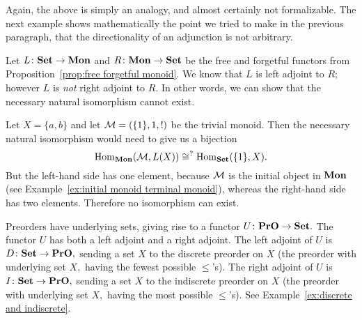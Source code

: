 \documentclass[CT4S-EN-RU]{subfiles}
\begin{document}
\begin{blockRUS}
\end{blockRUS}

\begin{blockENG}
Again, the above is simply an analogy, and almost certainly not formalizable. The next example shows mathematically the point we tried to make in the previous paragraph, that the directionality of an adjunction is not arbitrary.
\end{blockENG}

\begin{blockRUS}
\end{blockRUS}

\begin{exampleENG}\label{ex:adjunction monoids and sets}
Let $L\colon{\mathbf{Set}}\rightarrow{\mathbf{Mon}}$ and $R\colon{\mathbf{Mon}}\rightarrow{\mathbf{Set}}$ be the free and forgetful functors from Proposition~\ref{prop:free forgetful monoid}. We know that $L$ is left adjoint to $R$; however $L$ is {\em not} right adjoint to $R.$ In other words, we can show that the necessary natural isomorphism cannot exist.

Let $X=\{a,b\}$ and let $\mathcal{M}=(\{1\},1,!)$ be the trivial monoid. Then the necessary natural isomorphism would need to give us a bijection 
$$\operatorname{Hom}_{\mathbf{Mon}}(\mathcal{M},L(X))\cong^?\operatorname{Hom}_{\mathbf{Set}}(\{1\},X).$$ 
But the left-hand side has one element, because $\mathcal{M}$ is the initial object in ${\mathbf{Mon}}$ (see Example~\ref{ex:initial monoid terminal monoid}), whereas the right-hand side has two elements. Therefore no isomorphism can exist.
\end{exampleENG}

\begin{exampleRUS}\label{ex:adjunction monoids and sets}
\end{exampleRUS}

\begin{exampleENG}
Preorders have underlying sets, giving rise to a functor $U\colon{\mathbf{PrO}}\rightarrow{\mathbf{Set}}.$ The functor $U$ has both a left adjoint and a right adjoint. The left adjoint of $U$ is $D\colon{\mathbf{Set}}\rightarrow{\mathbf{PrO}},$ sending a set $X$ to the discrete preorder on $X$ (the preorder with underlying set $X,$ having the fewest possible $\leq$'s). The right adjoint of $U$ is $I\colon{\mathbf{Set}}\rightarrow{\mathbf{PrO}},$ sending a set $X$ to the indiscrete preorder on $X$ (the preorder with underlying set $X,$ having the most possible $\leq$'s). See Example~\ref{ex:discrete and indiscrete}. 
\end{exampleENG}
\end{document}
